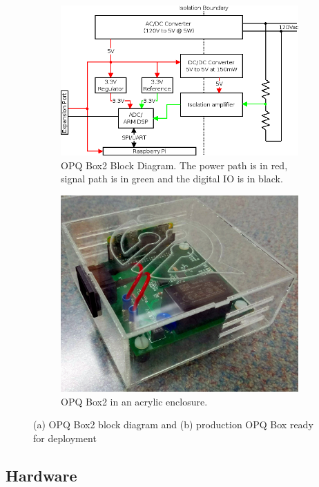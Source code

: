 \begin{figure}[h]
	\centering
	\begin{subfigure}{.5\textwidth}
	  \centering
	  \includegraphics[width=0.9\linewidth]{img/opqbox_diagram.png}
	  \caption{OPQ Box2 Block Diagram.
	  The power path is in red, signal path is in green and the digital IO is in black.}
	  \label{fig:opq:1:1}
	\end{subfigure}%
	\begin{subfigure}{.5\textwidth}
	  \centering
	  \includegraphics[width=0.7\linewidth]{img/opqbox_photo.jpg}
	  \caption{OPQ Box2 in an acrylic enclosure.}
	  \label{fig:opq:1:2}
	\end{subfigure}
	\caption{(a) OPQ Box2 block diagram and (b) production OPQ Box ready for deployment}
	\label{fig:opq:2}
\end{figure}

\subsection{Hardware}\label{subsec:hardware}

